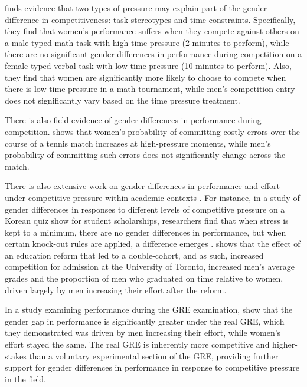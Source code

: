 \documentclass[letterpaper, nobind]{templates/ociamthesis}
\begin{document}
\textcite{Shurchkov2012} finds evidence that two types of pressure may explain part of the gender difference in competitiveness: task stereotypes and time constraints. Specifically, they find that women's performance suffers when they compete against others on a male-typed math task with high time pressure (2 minutes to perform), while there are no significant gender differences in performance during competition on a female-typed verbal task with low time pressure (10 minutes to perform). Also, they find that women are significantly more likely to choose to compete when there is low time pressure in a math tournament, while men's competition entry does not significantly vary based on the time pressure treatment.

There is also field evidence of gender differences in performance during competition. \textcite{Paserman2007} shows that women's probability of committing costly errors over the course of a tennis match increases at high-pressure moments, while men's probability of committing such errors does not significantly change across the match.

There is also extensive work on gender differences in performance and effort under competitive pressure within academic contexts \autocites{Iriberri2019,Cai2019,Ors2013,Azmat2016,Price2008}[see][ for a review on gender differences in math tests scores]{Niederle2010c}. For instance, in a study of gender differences in responses to different levels of competitive pressure on a Korean quiz show for student scholarships, researchers find that when stress is kept to a minimum, there are no gender differences in performance, but when certain knock-out rules are applied, a difference emerges \autocite{Booth2021}. \textcite{Morin2015} shows that the effect of an education reform that led to a double-cohort, and as such, increased competition for admission at the University of Toronto, increased men's average grades and the proportion of men who graduated on time relative to women, driven largely by men increasing their effort after the reform.

In a study examining performance during the GRE examination, \textcite{Attali2012} show that the gender gap in performance is significantly greater under the real GRE, which they demonstrated was driven by men increasing their effort, while women's effort stayed the same. The real GRE is inherently more competitive and higher-stakes than a voluntary experimental section of the GRE, providing further support for gender differences in performance in response to competitive pressure in the field.
\end{document}
